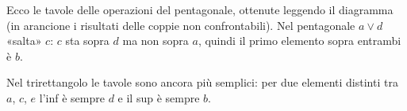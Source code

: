 \begin{spiegazione}
    Ecco le tavole delle operazioni del pentagonale, ottenute leggendo il diagramma (in arancione i risultati delle coppie non confrontabili).
    Nel pentagonale $a \vee d$ «salta» $c$: $c$ sta sopra $d$ ma non sopra $a$, quindi il primo elemento sopra entrambi è $b$.
    \begin{center}
    \end{center}
    Nel trirettangolo le tavole sono ancora più semplici: per due elementi distinti tra $a$, $c$, $e$ l'inf è sempre $d$ e il sup è sempre $b$.
\end{spiegazione}


